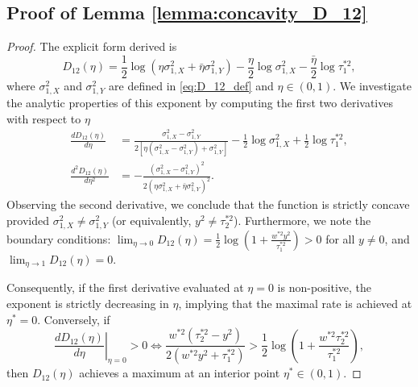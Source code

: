 \documentclass[accepted]{uai2026} %
\newcommand{\tsone}{\tau_1^{*2}}
\newcommand{\tstwo}{\tau_2^{*2}}
\theoremstyle{boldremark}
\begin{document}
\subsection{Proof of Lemma \ref{lemma:concavity_D_12}}

\begin{proof}
    The explicit form derived is
\begin{equation*}
    D_{12}(\eta) = \frac{1}{2}\log \left( \eta \sigma_{1,X}^2 + \bar{\eta}\sigma_{1, Y}^2 \right) - \frac{\eta}{2}\log \sigma_{1,X}^2 - \frac{\bar{\eta}}{2}\log \tsone,
\end{equation*}
where $\sigma_{1,X}^2$ and $\sigma_{1, Y}^2$ are defined in \eqref{eq:D_12_def} and $\eta \in (0,1)$. We investigate the analytic properties of this exponent by computing the first two derivatives with respect to $\eta$
\begin{align*}
    \frac{dD_{12}(\eta)}{d\eta} &= \frac{\sigma_{1,X}^2 - \sigma_{1, Y}^2}{2[\eta(\sigma_{1,X}^2-\sigma_{1,Y}^2)+\sigma_{1,Y}^2]} -  \frac{1}{2}\log\sigma_{1,X}^2 + \frac{1}{2}\log \tsone, \\
    \frac{d^2D_{12}(\eta)}{d\eta^2} &= -\frac{(\sigma_{1,X}^2-\sigma_{1,Y}^2)^2}{2(\eta\sigma_{1,X}^2+\bar{\eta}\sigma_{1,Y}^2)^2}.
\end{align*}
Observing the second derivative, we conclude that the function is strictly concave provided $\sigma_{1,X}^2 \neq \sigma_{1,Y}^2$ (or equivalently, $y^2 \neq \tstwo$). Furthermore, we note the boundary conditions: $\lim_{\eta \to 0}D_{12}(\eta) = \frac{1}{2} \log\left(1+\frac{w^{*2}y^2}{\tsone} \right) > 0$ for all $y \neq 0$, and $\lim_{\eta\to1}D_{12}(\eta) = 0$.

Consequently, if the first derivative evaluated at $\eta=0$ is non-positive, the exponent is strictly decreasing in $\eta$, implying that the maximal rate is achieved at $\eta^* = 0$. Conversely, if
\begin{equation}
    \label{eq:first_der_D12}
    \left. \frac{dD_{12}(\eta)}{d\eta}\right|_{\eta = 0} > 0 \iff \frac{w^{*2}(\tstwo-y^2)}{2(w^{*2}y^2+\tsone)} > \frac{1}{2}\log \left( 1+\frac{w^{*2}\tstwo}{\tsone} \right),
\end{equation}
then $D_{12}(\eta)$ achieves a maximum at an interior point $\eta^* \in (0,1)$. 
\end{proof}
\end{document}
